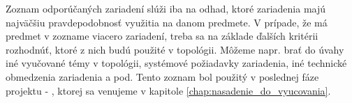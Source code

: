 Zoznam odporúčaných zariadení slúži iba na odhad, ktoré zariadenia majú najväčšiu pravdepodobnosť využitia na danom predmete. V prípade, že má predmet v zozname viacero zariadení, treba sa na základe ďalších kritérii rozhodnúť, ktoré z nich budú použité v topológii. Môžeme napr. brať do úvahy iné vyučované témy v topológii, systémové požiadavky zariadenia, iné technické obmedzenia zariadenia a pod. Tento zoznam bol použitý v poslednej fáze projektu - , ktorej sa venujeme v kapitole \ref{chap:nasadenie_do_vyucovania}.